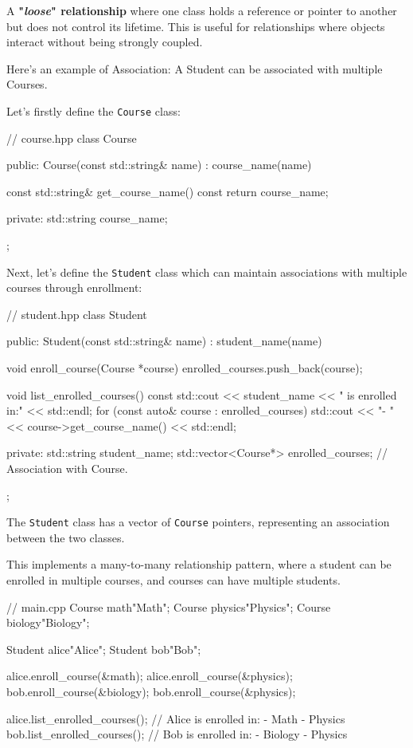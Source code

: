 A \textbf{"\textit{loose}" relationship} where one class holds a reference or pointer to another but does not control its lifetime. This is useful for relationships where objects interact without being strongly coupled.

\vspace{0.5em}

Here's an example of Association: A Student can be associated with multiple Courses.

Let's firstly define the \texttt{Course} class:

\begin{codeblock}[language=C++]
// course.hpp
class Course {
public:
    Course(const std::string& name) : course_name(name) {}

    const std::string& get_course_name() const {
        return course_name;
    }

private:
    std::string course_name;
};
\end{codeblock}

Next, let's define the \texttt{Student} class which can maintain associations with multiple courses through enrollment:

\begin{codeblock}[language=C++]
// student.hpp
class Student {
public:
    Student(const std::string& name) : student_name(name) {}

    void enroll_course(Course *course) {
        enrolled_courses.push_back(course);
    }

    void list_enrolled_courses() const {
        std::cout << student_name << " is enrolled in:" << std::endl;
        for (const auto& course : enrolled_courses) {
            std::cout << "- " << course->get_course_name() << std::endl;
        }
    }

private:
    std::string student_name;
    std::vector<Course*> enrolled_courses; // Association with Course.
};
\end{codeblock}

The \texttt{Student} class has a vector of \texttt{Course} pointers, representing an association between the two classes.

This implements a many-to-many relationship pattern, where a student can be enrolled in multiple courses, and courses can have multiple students.

\vspace{-0.5em}

\begin{codeblock}[language=C++]
// main.cpp
Course math{"Math"};
Course physics{"Physics"};
Course biology{"Biology"};

Student alice{"Alice"};
Student bob{"Bob"};

alice.enroll_course(&math);
alice.enroll_course(&physics);
bob.enroll_course(&biology);
bob.enroll_course(&physics);

alice.list_enrolled_courses(); // Alice is enrolled in: - Math - Physics
bob.list_enrolled_courses(); // Bob is enrolled in: - Biology - Physics
\end{codeblock}

